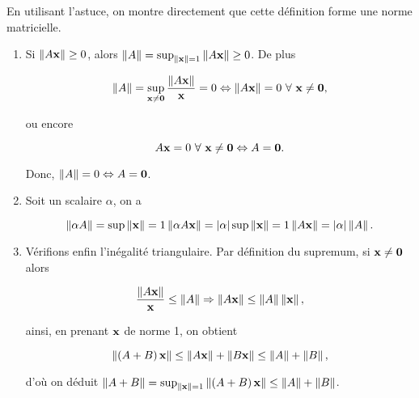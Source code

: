 En utilisant l'astuce, on montre directement que cette définition forme une norme matricielle.

\begin{enumerate}
  \item Si $\left\lVert A \mathbf{x}\right\rVert \geq 0$, alors $\left\lVert A\right\rVert = \sup_{\left\lVert\mathbf{x}\right\rVert = 1} \left\lVert A \mathbf{x}\right\rVert \geq 0$. De plus
  
  \begin{equation*}
    \left\lVert A\right\rVert = \sup_{\mathbf{x} \neq \mathbf{0}} \dfrac{\left\lVert A \mathbf{x}\right\rVert}{\mathbf{x}} = 0
    \Leftrightarrow
    \left\lVert A \mathbf{x}\right\rVert = 0 \ \forall \ \mathbf{x} \neq \mathbf{0},
  \end{equation*}
  
  ou encore
  
  \begin{equation*}
    A \mathbf{x} = 0 \ \forall \ \mathbf{x} \neq \mathbf{0}
    \Leftrightarrow
    A = \mathbf{0}.
  \end{equation*}
  
  Donc, $\left\lVert A\right\rVert = 0 \Leftrightarrow A = \mathbf{0}$.
  
  \item Soit un scalaire $\alpha$, on a 
  
  \begin{equation*}
    \left\lVert\alpha A\right\rVert
    = \sup{\left\lVert\mathbf{x}\right\rVert = 1} \left\lVert\alpha A \mathbf{x}\right\rVert
    = \left\lvert\alpha\right\rvert \sup{\left\lVert\mathbf{x}\right\rVert = 1} \left\lVert A \mathbf{x}\right\rVert
    = \left\lvert\alpha\right\rvert \left\lVert A\right\rVert.
  \end{equation*}
  
  \item Vérifions enfin l'inégalité triangulaire. Par définition du supremum, si $\mathbf{x} \neq \mathbf{0}$ alors
  
  \begin{equation*}
    \dfrac{\left\lVert A \mathbf{x}\right\rVert}{\mathbf{x}} \leq \left\lVert A\right\rVert
    \Rightarrow \left\lVert A \mathbf{x}\right\rVert \leq \left\lVert A\right\rVert \left\lVert\mathbf{x}\right\rVert,
  \end{equation*}
  
  ainsi, en prenant $\mathbf{x}$ de norme 1, on obtient
  
  \begin{equation*}
    \left\lVert\left(A + B\right) \mathbf{x}\right\rVert
    \leq \left\lVert A \mathbf{x}\right\rVert + \left\lVert B \mathbf{x}\right\rVert
    \leq \left\lVert A\right\rVert + \left\lVert B\right\rVert, 
  \end{equation*}
  
  d'où on déduit $\left\lVert A + B\right\rVert = \sup_{\left\lVert\mathbf{x}\right\rVert = 1} \left\lVert\left(A + B\right) \mathbf{x}\right\rVert \leq \left\lVert A\right\rVert + \left\lVert B\right\rVert$.
  
  
  
\end{enumerate}



